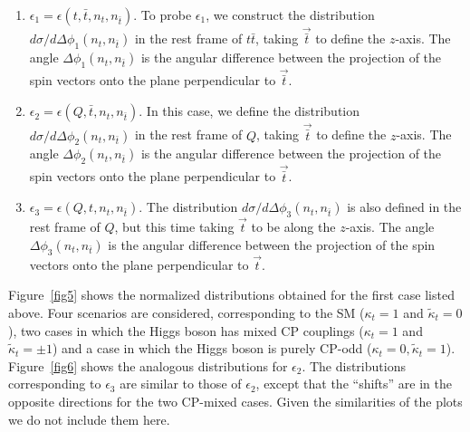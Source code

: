 \documentclass[aps,preprint,tightenlines,floatfix,superscriptaddress,nofootinbib,showpacs]{revtex4-1}
\def\tbar{\bar{t}}
\def\kp{\kappa_t}
\def\kpt{\tilde{\kappa}_t}
\def\TPa{\epsilon(t,\tbar,n_t,n_{\tbar})}
\def\TPb{\epsilon(Q,\tbar,n_t,n_{\tbar})}
\def\TPc{\epsilon(Q,t,n_t,n_{\tbar})}
\begin{document}
\begin{enumerate}
\item {\boldmath $\epsilon_1 = \TPa$.}  To probe $\epsilon_1$, we construct
  the distribution
  $d\sigma/d\Delta\phi_1(n_t,n_{\tbar})$ in the rest frame of $t\tbar$,
  taking $\vec{\tbar}$ to define the $z$-axis. The angle
  $\Delta\phi_1(n_t,n_{\tbar})$ is the angular difference between the
  projection of the spin vectors onto the plane perpendicular to
  $\vec{\tbar}$.
\item {\boldmath $\epsilon_2 = \TPb$.}  In this case, we
  define the distribution
  $d\sigma/d\Delta\phi_2(n_t,n_{\tbar})$ in the rest frame of $Q$, taking
  $\vec{\tbar}$ to define the $z$-axis. The angle
  $\Delta\phi_2(n_t,n_{\tbar})$ is the angular difference between the
  projection of the spin vectors onto the plane perpendicular to
  $\vec{\tbar}$.
\item {\boldmath $\epsilon_3 = \TPc$.}  The distribution
  $d\sigma/d\Delta\phi_3(n_t,n_{\tbar})$ is also defined
  in the rest frame of $Q$, but this time taking
  $\vec{t}$ to be along the $z$-axis. The angle $\Delta\phi_3(n_t,n_{\tbar})$
  is the angular difference between the projection of the spin vectors
  onto the plane perpendicular to $\vec{t}$.
\end{enumerate}
\par
%
Figure~\ref{fig5} shows the normalized distributions obtained
for the first case listed above.
Four scenarios are considered, corresponding to the SM
($\kp= 1$ and $\kpt=0$), two cases in which the Higgs boson
has mixed $\mathrm{CP}$ couplings ($\kp= 1$ and $\kpt=\pm 1$)
and a case in which the Higgs boson is purely 
$\mathrm{CP}$-odd ($\kp= 0,\kpt=1$). Figure~\ref{fig6} shows
the analogous distributions for $\epsilon_2$. The distributions
corresponding to $\epsilon_3$ are similar to those of $\epsilon_2$,
except that the ``shifts'' are in the opposite directions for
the two $\mathrm{CP}$-mixed cases.  Given the similarities of the
plots we do not include them here. 
\end{document}
